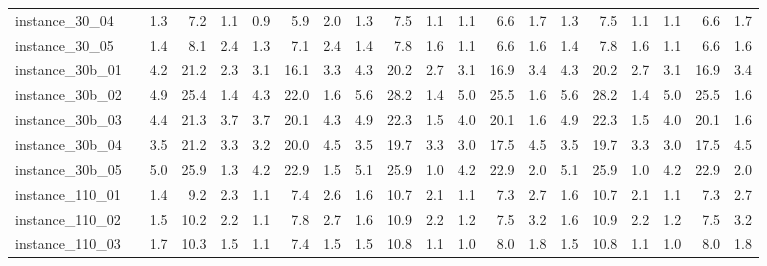 \documentclass[12pt,a4paper,openright,twoside]{book}
\begin{document}
\begin{table}[H]
{\begin{tabular}{|ll|rrrrrr|rrrrrr|rrrrrr|}
 instance\_30\_04             &     &       1.3  &   7.2  &  1.1  &   0.9  &   5.9  &  2.0  &        1.3  &   7.5  &  1.1  &   1.1  &   6.6  &  1.7      &   1.3  &   7.5  &  1.1  &   1.1  &   6.6  &  1.7   \\     
 instance\_30\_05             &     &       1.4  &   8.1  &  2.4  &   1.3  &   7.1  &  2.4  &        1.4  &   7.8  &  1.6  &   1.1  &   6.6  &  1.6      &   1.4  &   7.8  &  1.6  &   1.1  &   6.6  &  1.6   \\     
 instance\_30b\_01             &     &       4.2  &   21.2  &  2.3  &   3.1  &   16.1  &  3.3  &      4.3  &   20.2  &  2.7  &   3.1  &   16.9  &  3.4      &   4.3  &   20.2  &  2.7  &   3.1  &   16.9  &  3.4   \\         
 instance\_30b\_02             &     &       4.9  &   25.4  &  1.4  &   4.3  &   22.0  &  1.6  &      5.6  &   28.2  &  1.4  &   5.0  &   25.5  &  1.6      &   5.6  &   28.2  &  1.4  &   5.0  &   25.5  &  1.6   \\         
 instance\_30b\_03             &     &       4.4  &   21.3  &  3.7  &   3.7  &   20.1  &  4.3  &      4.9  &   22.3  &  1.5  &   4.0  &   20.1  &  1.6      &   4.9  &   22.3  &  1.5  &   4.0  &   20.1  &  1.6   \\         
 instance\_30b\_04             &     &       3.5  &   21.2  &  3.3  &   3.2  &   20.0  &  4.5  &      3.5  &   19.7  &  3.3  &   3.0  &   17.5  &  4.5      &   3.5  &   19.7  &  3.3  &   3.0  &   17.5  &  4.5   \\         
 instance\_30b\_05             &     &       5.0  &   25.9  &  1.3  &   4.2  &   22.9  &  1.5  &      5.1  &   25.9  &  1.0  &   4.2  &   22.9  &  2.0      &   5.1  &   25.9  &  1.0  &   4.2  &   22.9  &  2.0   \\         
 instance\_110\_01            &     &       1.4  &   9.2  &  2.3  &   1.1  &   7.4  &  2.6  &        1.6  &   10.7  &  2.1  &   1.1  &   7.3  &  2.7       &   1.6  &   10.7  &  2.1  &   1.1  &   7.3  &  2.7    \\        
 instance\_110\_02            &     &       1.5  &   10.2  &  2.2  &   1.1  &   7.8  &  2.7  &       1.6  &   10.9  &  2.2  &   1.2  &   7.5  &  3.2       &   1.6  &   10.9  &  2.2  &   1.2  &   7.5  &  3.2    \\            
 instance\_110\_03            &     &       1.7  &   10.3  &  1.5  &   1.1  &   7.4  &  1.5  &       1.5  &   10.8  &  1.1  &   1.0  &   8.0  &  1.8       &   1.5  &   10.8  &  1.1  &   1.0  &   8.0  &  1.8    \\            

\end{tabular}}
\end{table}
\end{document}
